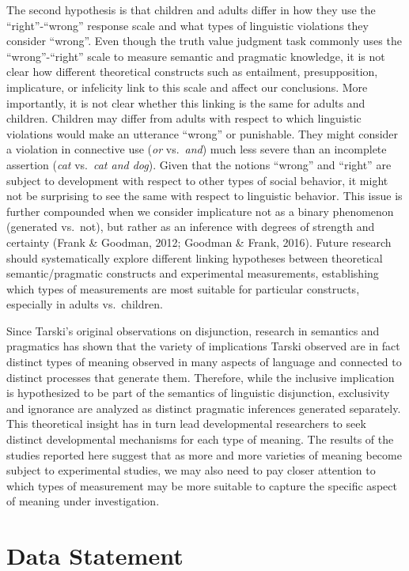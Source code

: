 \documentclass[
  english,
  ,man,floatsintext]{apa6}
\begin{document}
The second hypothesis is that children and adults differ in how they use the \enquote{right}-\enquote{wrong} response scale and what types of linguistic violations they consider \enquote{wrong}. Even though the truth value judgment task commonly uses the \enquote{wrong}-\enquote{right} scale to measure semantic and pragmatic knowledge, it is not clear how different theoretical constructs such as entailment, presupposition, implicature, or infelicity link to this scale and affect our conclusions. More importantly, it is not clear whether this linking is the same for adults and children. Children may differ from adults with respect to which linguistic violations would make an utterance \enquote{wrong} or punishable. They might consider a violation in connective use (\emph{or} vs.~\emph{and}) much less severe than an incomplete assertion (\emph{cat} vs.~\emph{cat and dog}). Given that the notions \enquote{wrong} and \enquote{right} are subject to development with respect to other types of social behavior, it might not be surprising to see the same with respect to linguistic behavior. This issue is further compounded when we consider implicature not as a binary phenomenon (generated vs.~not), but rather as an inference with degrees of strength and certainty (Frank \& Goodman, 2012; Goodman \& Frank, 2016). Future research should systematically explore different linking hypotheses between theoretical semantic/pragmatic constructs and experimental measurements, establishing which types of measurements are most suitable for particular constructs, especially in adults vs.~children.

Since Tarski's original observations on disjunction, research in semantics and pragmatics has shown that the variety of implications Tarski observed are in fact distinct types of meaning observed in many aspects of language and connected to distinct processes that generate them. Therefore, while the inclusive implication is hypothesized to be part of the semantics of linguistic disjunction, exclusivity and ignorance are analyzed as distinct pragmatic inferences generated separately. This theoretical insight has in turn lead developmental researchers to seek distinct developmental mechanisms for each type of meaning. The results of the studies reported here suggest that as more and more varieties of meaning become subject to experimental studies, we may also need to pay closer attention to which types of measurement may be more suitable to capture the specific aspect of meaning under investigation.

\hypertarget{data-statement}{%
\section{Data Statement}\label{data-statement}}
\end{document}
